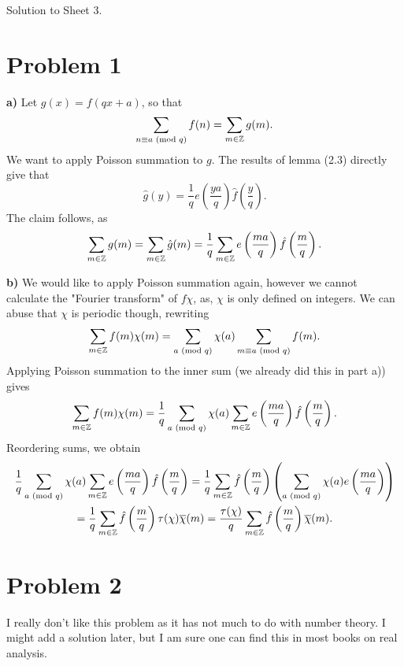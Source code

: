 \documentclass[a4paper,11pt]{article}
\begin{document}
\begin{center}
    \huge{ Solution to Sheet 3. }
\end{center}

\section*{Problem 1} %
\textbf{a)} Let $g(x) = f(qx + a)$, so that
\[
    \sum_{n \equiv a \text{ (mod $q$)}} f(n) = \sum_{m \in \mathbb{Z}} g(m).
\]
We want to apply Poisson summation to $g$. The results of lemma (2.3) directly
give that 
$$\hat g(y) = \frac 1q e\left( \frac{ya}q \right) \hat f\left(\frac yq \right).$$
The claim follows, as
$$ \sum_{m \in \mathbb{Z}} g(m) = \sum_{m \in \mathbb{Z}} \hat g(m) = \frac 1q \sum_{m \in \mathbb{Z}} 
    e\left( \frac{ma}q \right) \hat f\left(\frac mq \right).$$

\textbf{b)} We would like to apply Poisson summation again, however we cannot 
calculate the "Fourier transform" of $f\chi$, as, $\chi$ is only defined 
on integers. We can abuse that $\chi$ is periodic though, rewriting
\[
    \sum_{m \in \mathbb{Z}} f(m) \chi(m) = \sum_{a \text{ (mod $q$)}} \chi(a) \sum_{m \equiv a \text{ (mod $q$)}}
    f(m).
\]
Applying Poisson summation to the inner sum (we already did this in part
a)) gives
\[
    \sum_{m \in \mathbb{Z}} f(m) \chi(m) = \frac 1q \sum_{a \text{ (mod $q$)}} \chi(a) \sum_{m \in \mathbb{Z}} 
    e\left( \frac{ma}q \right) \hat f\left(\frac mq \right).
\]
Reordering sums, we obtain
\begin{multline*}
     \frac 1q \sum_{a \text{ (mod $q$)}} \chi(a) \sum_{m \in \mathbb{Z}} 
     e\left( \frac{ma}q \right) \hat f\left(\frac mq \right) = \frac 1q \sum_{m
         \in \mathbb{Z}} \hat f\left(\frac mq \right) \left( \sum_{a \text{ (mod $q$)}}
             \chi(a) e\left(\frac{ma}q \right) \right) \\ =  \frac 1q \sum_{m
         \in \mathbb{Z}} \hat f\left(\frac mq \right) \tau(\chi) \overline \chi(m) =
         \frac {\tau(\chi)}q \sum_{m \in \mathbb{Z}} \hat f\left(\frac mq \right)
         \overline \chi(m). 
\end{multline*}

\section*{Problem 2}
I really don't like this problem as it has not much to do with number theory. 
I might add a solution later, but I am sure one can find this in most books on 
real analysis.
\end{document}

